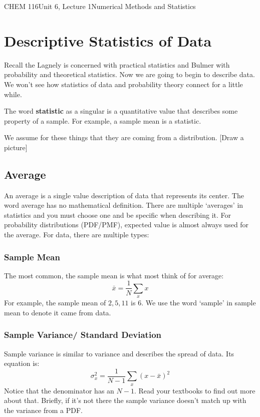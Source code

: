 \documentclass{article}
\begin{document}
\begin{tdoc}{CHEM 116}{Unit 6, Lecture 1}{Numerical Methods and Statistics}


\section{Descriptive Statistics of Data}
Recall the Lagnely is concerned with practical statistics and Bulmer
with probability and theoretical statistics. Now we are going to begin
to describe data. We won't see how statistics of data and probability
theory connect for a little while.

The word {\bf statistic} as a singular is a quantitative value that
describes some property of a sample. For example, a sample mean is a
statistic.

We assume for these things that they are coming from a
distribution. [Draw a picture]

\subsection{Average}
An average is a single value description of data that represents its
center. The word average has no mathematical definition. There are
multiple `averages' in statistics and you must choose one and be
specific when describing it. For probability distributions (PDF/PMF),
expected value is almost always used for the average. For data, there
are multiple types:

\subsubsection{Sample Mean}
The most common, the sample mean is what most think of for average:
\begin{equation}
\bar{x} = \frac{1}{N}\sum_x x
\end{equation}
For example, the sample mean of $2,5,11$ is 6. We use the word
`sample' in sample mean to denote it came from data.

\subsubsection{Sample Variance/ Standard Deviation}
Sample variance is similar to variance and describes the spread of
data. Its equation is:
\begin{equation}
\sigma_x^2 = \frac{1}{N - 1} \sum_x (x - \bar{x})^2
\end{equation}
Notice that the denominator has an $N - 1$. Read your textbooks to
find out more about that. Briefly, if it's not there the sample
variance doesn't match up with the variance from a PDF. 


\end{tdoc}
\end{document}
